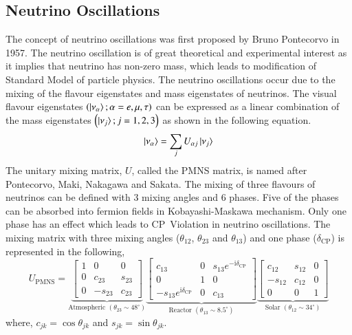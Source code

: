 \subsection{Neutrino Oscillations}
The concept of neutrino oscillations was first proposed by Bruno Pontecorvo in 1957\cite{pontecorvo1,pontecorvo2}. The neutrino oscillation is of great theoretical and experimental interest as it implies that neutrino has non-zero mass, which leads to modification of Standard Model of particle physics. The neutrino oscillations occur due to the mixing of the flavour eigenstates and mass eigenstates of neutrinos. The visual flavour eigenstates $\left(\ket{\nu_{\alpha}};\alpha=e,\mu,\tau\right)$ can be expressed as a linear combination of the mass eigenstates $\left(\ket{\nu_{j}};j=1,2,3\right)$ as shown in the following equation.
\begin{equation}
  \ket{\nu_{\alpha}}=\sum_{j}U_{\alpha j}\ket{\nu_{j}} \label{eq:tzero}
\end{equation}
The unitary mixing matrix, $U$, called the PMNS matrix, is named after Pontecorvo, Maki, Nakagawa and Sakata. The mixing of three flavours of neutrinos can be defined with 3 mixing angles and 6 phases. Five of the phases can be absorbed into fermion fields in Kobayashi-Maskawa mechanism\cite{kobayashimaskawa}. Only one phase has an effect which leads to CP~Violation in neutrino oscillations. The mixing matrix with three mixing angles ($\theta_{12}$, $\theta_{23}$ and $\theta_{13}$) and one phase ($\delta_{\mathrm{CP}}$) is represented in the following,
\begin{equation}
  U_{\mathrm{PMNS}} =
  \underbrace{\begin{bmatrix}
      1 & 0 & 0 \\
      0 & c_{23} & s_{23} \\
      0 & -s_{23} & c_{23}
    \end{bmatrix}
  }_{\text{Atmospheric }\left(\theta_{23}\sim 48^{\circ}\right)}
  \underbrace{\begin{bmatrix}
      c_{13} & 0 & s_{13}e^{-\mathrm{i}\delta_{\mathrm{CP}}} \\
      0 & 1 & 0 \\
      -s_{13}e^{\mathrm{i}\delta_{\mathrm{CP}}} & 0 & c_{13}
    \end{bmatrix}
  }_{\text{Reactor }\left(\theta_{13}\sim 8.5^{\circ}\right)}
  \underbrace{\begin{bmatrix}
      c_{12} & s_{12} & 0 \\
      -s_{12} & c_{12} & 0 \\
      0 & 0 & 1
    \end{bmatrix}
  }_{\text{Solar }\left(\theta_{12}\sim 34^{\circ}\right)}
   \label{eq:pmns}
\end{equation}
where, $c_{jk}=\cos\theta_{jk}$ and $s_{jk}=\sin\theta_{jk}$.

